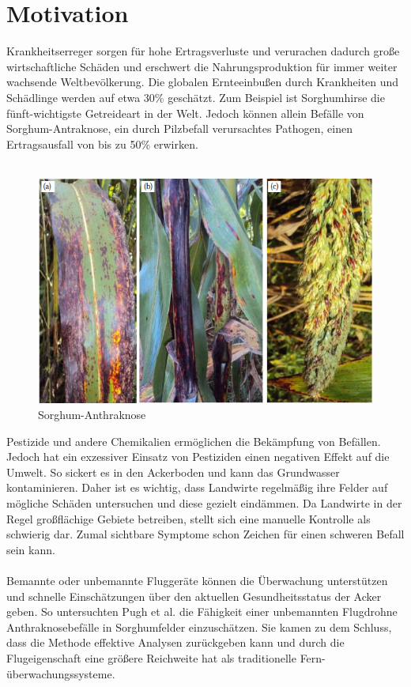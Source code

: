 \section{Motivation}

Krankheitserreger sorgen für hohe Ertragsverluste und verurachen dadurch große wirtschaftliche Schäden und erschwert die Nahrungsproduktion für immer weiter wachsende Weltbevölkerung. Die globalen Ernteeinbußen durch Krankheiten und Schädlinge werden auf etwa 30\% geschätzt.\cite{ref:spiegel} Zum Beispiel ist Sorghumhirse die fünft-wichtigste Getreideart in der Welt. Jedoch können allein Befälle von Sorghum-Antraknose, ein durch Pilzbefall verursachtes Pathogen, einen Ertragsausfall von bis zu 50\% erwirken.\cite[S. 77]{ref:zeller}
\\\\
\begin{figure}[ht]
  \centering
  \includegraphics[width=.7\textwidth]{pics/anthracnose.PNG}
  \caption{Sorghum-Anthraknose\cite[S. 77]{ref:tsedaley}}
  \label{fig:anthracnose}
\end{figure}
\noindent
Pestizide und andere Chemikalien ermöglichen die Bekämpfung von Befällen. Jedoch hat ein exzessiver Einsatz von Pestiziden einen negativen Effekt auf die Umwelt. So sickert es in den Ackerboden und kann das Grundwasser kontaminieren. Daher ist es wichtig, dass Landwirte regelmäßig ihre Felder auf mögliche Schäden untersuchen und diese gezielt eindämmen. Da Landwirte in der Regel großflächige Gebiete betreiben, stellt sich eine manuelle Kontrolle als schwierig dar. Zumal sichtbare Symptome schon Zeichen für einen schweren Befall sein kann.
\\\\
Bemannte oder unbemannte Fluggeräte können die Überwachung unterstützen und schnelle Einschätzungen über den aktuellen Gesundheitsstatus der Acker geben. So untersuchten Pugh et al. die Fähigkeit einer unbemannten Flugdrohne Anthraknosebefälle in Sorghumfelder einzuschätzen. Sie kamen zu dem Schluss, dass die Methode effektive Analysen zurückgeben kann und durch die Flugeigenschaft eine größere Reichweite hat als traditionelle Fern-überwachungssysteme.\cite[S. 861 ff.]{ref:pug}
